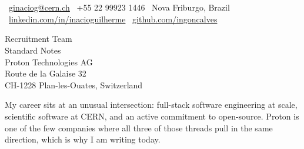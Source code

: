 \documentclass[11pt,a4paper]{article}
\begin{document}

\noindent%
\begin{minipage}[t]{\dimexpr\linewidth-3cm\relax}%
\\[0.4em]
\\[0.8em]
{\color{LightGrey}\small
\faEnvelope\ \href{mailto:ginaciog@cern.ch}{ginaciog@cern.ch}\contactBullet%
\faPhone\ +55 22 99923 1446\contactBullet%
\faMapMarker\ Nova Friburgo, Brazil\\[0.3em]
\faLinkedin\ \href{https://linkedin.com/in/inacioguilherme}{linkedin.com/in/inacioguilherme}\contactBullet%
\faGithub\ \href{https://github.com/ingoncalves}{github.com/ingoncalves}
}%
\end{minipage}%
\hfill%
\begin{minipage}[t]{2.7cm}%
%
\end{minipage}%
\par

\vspace{0.75em}
\dividerLine
\vspace{1.25em}



\vspace{1em}


{\color{SlateGrey}
Recruitment Team\\
Standard Notes\\
Proton Technologies AG\\
Route de la Galaise 32\\
CH-1228 Plan-les-Ouates, Switzerland
}

\vspace{1.25em}



\vspace{1em}




My career sits at an unusual intersection: full-stack software engineering at scale, scientific software at CERN, and an active commitment to open-source. Proton is one of the few companies where all three of those threads pull in the same direction, which is why I am writing today.
\end{document}
